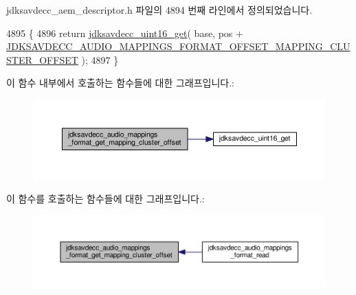 jdksavdecc\+\_\+aem\+\_\+descriptor.\+h 파일의 4894 번째 라인에서 정의되었습니다.


\begin{DoxyCode}
4895 \{
4896     \textcolor{keywordflow}{return} \hyperlink{group__endian_ga3fbbbc20be954aa61e039872965b0dc9}{jdksavdecc\_uint16\_get}( base, pos + 
      \hyperlink{group__audio__mappings__format_gad5160e8fbcbbe93ceced69c7845ca055}{JDKSAVDECC\_AUDIO\_MAPPINGS\_FORMAT\_OFFSET\_MAPPING\_CLUSTER\_OFFSET}
       );
4897 \}
\end{DoxyCode}


이 함수 내부에서 호출하는 함수들에 대한 그래프입니다.\+:
\nopagebreak
\begin{figure}[H]
\begin{center}
\leavevmode
\includegraphics[width=350pt]{group__audio__mappings__format_ga66321dd06b3768bc30d0f94eeeb60e78_cgraph}
\end{center}
\end{figure}




이 함수를 호출하는 함수들에 대한 그래프입니다.\+:
\nopagebreak
\begin{figure}[H]
\begin{center}
\leavevmode
\includegraphics[width=350pt]{group__audio__mappings__format_ga66321dd06b3768bc30d0f94eeeb60e78_icgraph}
\end{center}
\end{figure}


